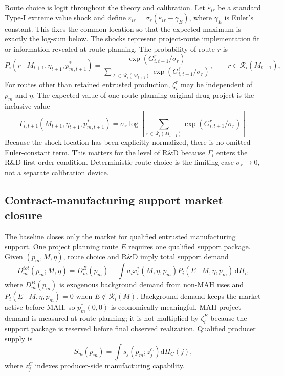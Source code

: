 \documentclass[12pt]{article}
\newcommand{\1}{\mathbf{1}}
\newcommand{\dd}{\mathrm{d}}
\newcommand{\calR}{\mathcal{R}}
\begin{document}
Route choice is logit throughout the theory and calibration. Let $\widetilde\varepsilon_{ir}$ be a standard Type-I extreme value shock and define $\varepsilon_{ir}=\sigma_r(\widetilde\varepsilon_{ir}-\gamma_E)$, where $\gamma_E$ is Euler's constant. This fixes the common location so that the expected maximum is exactly the log-sum below. The shocks represent project-route implementation fit or information revealed at route planning. The probability of route $r$ is
\begin{equation}
    P_i(r\mid M_{t+1},\eta_{t+1},p^*_{m,t+1})
    =
    \frac{\exp(G^r_{i,t+1}/\sigma_r)}
    {\sum_{\ell\in\calR_i(M_{t+1})}\exp(G^\ell_{i,t+1}/\sigma_r)},
    \qquad r\in\calR_i(M_{t+1}),
    \label{eq:logit_prob}
\end{equation}
For routes other than retained entrusted production, $\zeta_i^r$ may be independent of $p_m$ and $\eta$.
The expected value of one route-planning original-drug project is the inclusive value
\begin{equation}
    \Gamma_{i,t+1}(M_{t+1},\eta_{t+1},p^*_{m,t+1})
    =
    \sigma_r
    \log
    \left[
    \sum_{r\in\calR_i(M_{t+1})}
    \exp(G^r_{i,t+1}/\sigma_r)
    \right].
    \label{eq:Gamma_general}
\end{equation}
Because the shock location has been explicitly normalized, there is no omitted Euler-constant term. This matters for the level of R\&D because $\Gamma_i$ enters the R\&D first-order condition. Deterministic route choice is the limiting case $\sigma_r\to0$, not a separate calibration device.

\subsection{Contract-manufacturing support market closure}
\label{sec:cm_market_baseline}

The baseline closes only the market for qualified entrusted manufacturing support. One project planning route $E$ requires one qualified support package. Given $(p_m,M,\eta)$, route choice and R\&D imply total support demand
\begin{equation}
    D_m^{tot}(p_m;M,\eta)
    =
    D_m^B(p_m)
    +\int
    a_i x_i^*(M,\eta,p_m)
    P_i(E\mid M,\eta,p_m)
    \,\dd H_i,
    \label{eq:cm_demand_baseline}
\end{equation}
where $D_m^B(p_m)$ is exogenous background demand from non-MAH uses and $P_i(E\mid M,\eta,p_m)=0$ when $E\notin\calR_i(M)$. Background demand keeps the market active before MAH, so $p_m^*(0,0)$ is economically meaningful. MAH-project demand is measured at route planning; it is not multiplied by $\zeta_i^E$ because the support package is reserved before final observed realization. Qualified producer supply is
\begin{equation}
    S_m(p_m)=\int s_j(p_m;z_j^C)\dd H_C(j),
    \label{eq:cm_supply_baseline}
\end{equation}
where $z_j^C$ indexes producer-side manufacturing capability.
\end{document}

